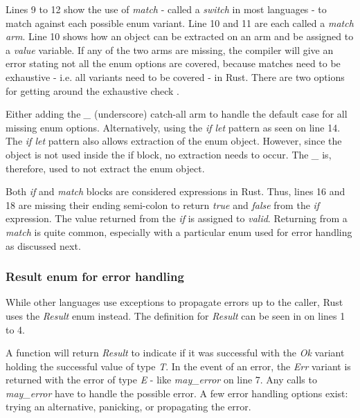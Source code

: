 
Lines 9 to 12 show the use of \textit{match} - called a \textit{switch} in most languages - to match against each possible enum variant.
Line 10 and 11 are each called a \textit{match arm}.
Line 10 shows how an object can be extracted on an arm and be assigned to a \textit{value} variable.
If any of the two arms are missing, the compiler will give an error stating not all the enum options are covered, because matches need to be exhaustive - i.e. all variants need to be covered - in Rust.
There are two options for getting around the exhaustive check \cite{klabnik_2019_01}.

Either adding the \textit{\_} (underscore) catch-all arm to handle the default case for all missing enum options.
Alternatively, using the \textit{if let} pattern as seen on line 14.
The \textit{if let} pattern also allows extraction of the enum object.
However, since the object is not used inside the if block, no extraction needs to occur.
The \textit{\_} is, therefore, used to not extract the enum object.

Both \textit{if} and \textit{match} blocks are considered expressions in Rust.
Thus, lines 16 and 18 are missing their ending semi-colon to return \textit{true} and \textit{false} from the \textit{if} expression.
The value returned from the \textit{if} is assigned to \textit{valid}.
Returning from a \textit{match} is quite common, especially with a particular enum used for error handling as discussed next.

\subsubsection{Result enum for error handling}
While other languages use exceptions to propagate errors up to the caller, Rust uses the \textit{Result} enum instead.
The definition for \textit{Result} can be seen in  on lines 1 to 4.


A function will return \textit{Result} to indicate if it was successful with the \textit{Ok} variant holding the successful value of type \textit{T}.
In the event of an error, the \textit{Err} variant is returned with the error of type \textit{E} - like \textit{may\_error} on line 7.
Any calls to \textit{may\_error} have to handle the possible error.
A few error handling options exist: trying an alternative, panicking, or propagating the error.

